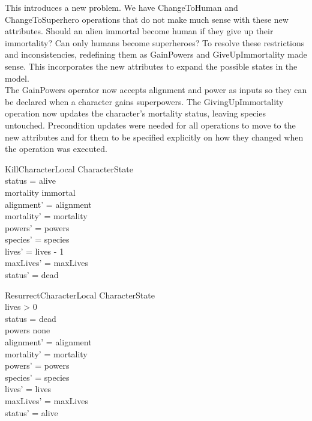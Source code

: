 \documentclass{article}
\begin{document}
\hspace{-0.7cm} This introduces a new problem. We have ChangeToHuman and ChangeToSuperhero operations that do not make much sense with these new attributes. Should an alien immortal become human if they give up their immortality? Can only humans become superheroes? To resolve these restrictions and inconsistencies, redefining them as GainPowers and GiveUpImmortality made sense. This incorporates the new attributes to expand the possible states in the model. \\
\newline
The GainPowers operator now accepts alignment and power as inputs so they can be declared when a character gains superpowers. The GivingUpImmortality operation now updates the character's mortality status, leaving species untouched. Precondition updates were needed for all operations to move to the new attributes and for them to be specified explicitly on how they changed when the operation was executed.

\begin{schema}{KillCharacterLocal} 
\Delta CharacterState \\
\where
status = alive \\
mortality \neq immortal \\
alignment' = alignment \\
mortality' = mortality \\
powers' = powers \\ 
species' = species \\
lives' = lives - 1 \\
maxLives' = maxLives \\
status' = dead \\
\end{schema}

\begin{schema}{ResurrectCharacterLocal}
\Delta CharacterState \\
\where
lives > 0 \\
status = dead \\
powers \neq none \\ 
alignment' = alignment \\
mortality' = mortality \\
powers' = powers \\ 
species' = species \\
lives' = lives \\
maxLives' = maxLives \\
status' = alive \\
\end{schema}
\end{document}
